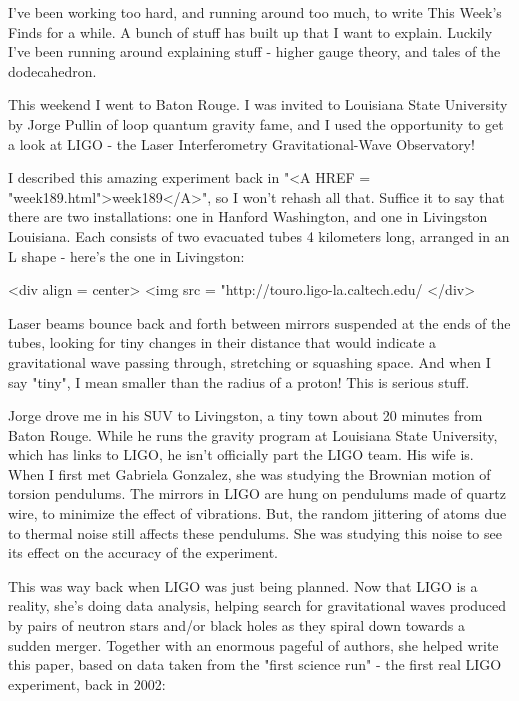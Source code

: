 

I've been working too hard, and running around too much, to write 
This Week's Finds for a while.  A bunch of stuff has built up 
that I want to explain.  Luckily I've been running around explaining 
stuff - higher gauge theory, and tales of the dodecahedron.

This weekend I went to Baton Rouge.  I was invited to Louisiana 
State University by Jorge Pullin of loop quantum gravity fame, and 
I used the opportunity to get a look at LIGO - the Laser 
Interferometry Gravitational-Wave Observatory!

I described this amazing experiment back in "<A HREF =
"week189.html">week189</A>", so I won't rehash all that.  Suffice
it to say that there are two installations: one in Hanford Washington,
and one in Livingston Louisiana.  Each consists of two evacuated tubes
4 kilometers long, arranged in an L shape - here's the one in Livingston:


<div align = center>
<img src = "http://touro.ligo-la.caltech.edu/%
</div>

Laser beams bounce back
and forth between mirrors suspended at the ends of the tubes, looking
for tiny changes in their distance that would indicate a gravitational
wave passing through, stretching or squashing space.  And when I say
"tiny", I mean smaller than the radius of a proton!  This is
serious stuff.

Jorge drove me in his SUV to Livingston, a tiny town about 20 minutes 
from Baton Rouge.  While he runs the gravity program at Louisiana 
State University, which has links to LIGO, he isn't officially part 
the LIGO team.  His wife is.  When I first met Gabriela Gonzalez, she 
was studying the Brownian motion of torsion pendulums.  The mirrors in
LIGO are hung on pendulums made of quartz wire, to minimize the effect 
of vibrations.  But, the random jittering of atoms due to thermal 
noise still affects these pendulums.  She was studying this noise to 
see its effect on the accuracy of the experiment.  

This was way back when LIGO was just being planned.  Now that LIGO is
a reality, she's doing data analysis, helping search for gravitational
waves produced by pairs of neutron stars and/or black holes as they 
spiral down towards a sudden merger.  Together with an enormous 
pageful of authors, she helped write this paper, based on data taken 
from the "first science run" - the first real LIGO experiment, back 
in 2002:

